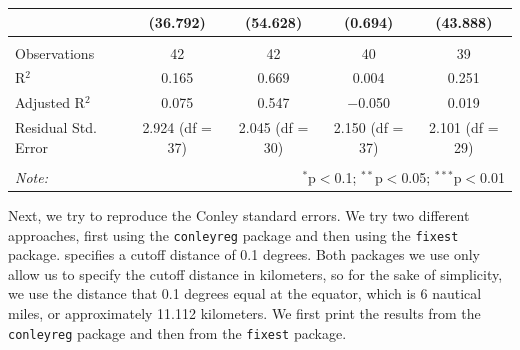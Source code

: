 \documentclass[
  a4paper,
]{article}
\begin{document}
\begin{center}
{\begin{tabular}{@{\extracolsep{3pt}}lcccc}
  & (36.792) & (54.628) & (0.694) & (43.888) \\ 
 \hline \\[-1.8ex] 
Observations & 42 & 42 & 40 & 39 \\ 
R$^{2}$ & 0.165 & 0.669 & 0.004 & 0.251 \\ 
Adjusted R$^{2}$ & 0.075 & 0.547 & $-$0.050 & 0.019 \\ 
Residual Std. Error & 2.924 (df = 37) & 2.045 (df = 30) & 2.150 (df = 37) & 2.101 (df = 29) \\ 
\hline 
\hline \\[-1.8ex] 
\textit{Note:}  & \multicolumn{4}{r}{$^{*}$p$<$0.1; $^{**}$p$<$0.05; $^{***}$p$<$0.01} \\ 
\end{tabular} 
}\end{center}

Next, we try to reproduce the Conley standard errors. We try two
different approaches, first using the \texttt{conleyreg} package and
then using the \texttt{fixest} package. \textcite{valencia2019}
specifies a cutoff distance of 0.1 degrees. Both packages we use only
allow us to specify the cutoff distance in kilometers, so for the sake
of simplicity, we use the distance that 0.1 degrees equal at the
equator, which is 6 nautical miles, or approximately 11.112 kilometers.
We first print the results from the \texttt{conleyreg} package and then
from the \texttt{fixest} package.
\end{document}
